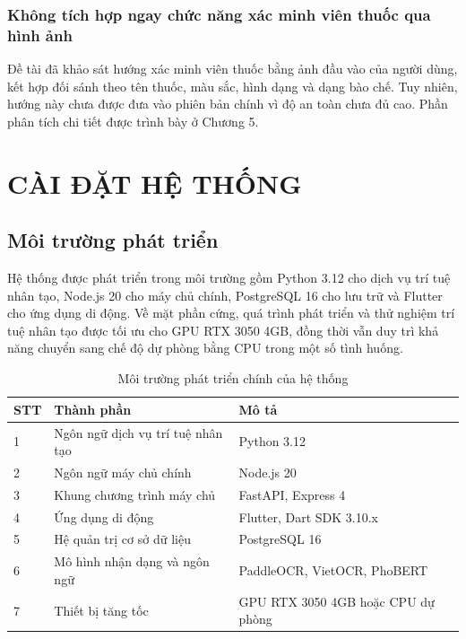 \documentclass[12pt,a4paper]{report}
\renewcommand{\arraystretch}{1.25}
\begin{document}
\subsection{Không tích hợp ngay chức năng xác minh viên thuốc qua hình ảnh}

Đề tài đã khảo sát hướng xác minh viên thuốc bằng ảnh đầu vào của người dùng, kết hợp đối sánh theo tên thuốc, màu sắc, hình dạng và dạng bào chế. Tuy nhiên, hướng này chưa được đưa vào phiên bản chính vì độ an toàn chưa đủ cao. Phần phân tích chi tiết được trình bày ở Chương 5.

\chapter{CÀI ĐẶT HỆ THỐNG}

\section{Môi trường phát triển}

Hệ thống được phát triển trong môi trường gồm Python 3.12 cho dịch vụ trí tuệ nhân tạo, Node.js 20 cho máy chủ chính, PostgreSQL 16 cho lưu trữ và Flutter cho ứng dụng di động. Về mặt phần cứng, quá trình phát triển và thử nghiệm trí tuệ nhân tạo được tối ưu cho GPU RTX 3050 4GB, đồng thời vẫn duy trì khả năng chuyển sang chế độ dự phòng bằng CPU trong một số tình huống.

\begin{table}[htbp]
\centering
\caption{Môi trường phát triển chính của hệ thống}
\label{tab:environment}
{\renewcommand{\arraystretch}{1.4}
\begin{tabularx}{\textwidth}{C{1.2cm}L{5cm}Y}
\toprule
\textbf{STT} & \textbf{Thành phần} & \textbf{Mô tả} \\
 & Ngôn ngữ dịch vụ trí tuệ nhân tạo & Python 3.12 \\
2 & Ngôn ngữ máy chủ chính & Node.js 20 \\
3 & Khung chương trình máy chủ & FastAPI, Express 4 \\
4 & Ứng dụng di động & Flutter, Dart SDK 3.10.x \\
5 & Hệ quản trị cơ sở dữ liệu & PostgreSQL 16 \\
6 & Mô hình nhận dạng và ngôn ngữ & PaddleOCR, VietOCR, PhoBERT \\
7 & Thiết bị tăng tốc & GPU RTX 3050 4GB hoặc CPU dự phòng \\
\bottomrule
\end{tabularx}}
\end{table}
\end{document}
